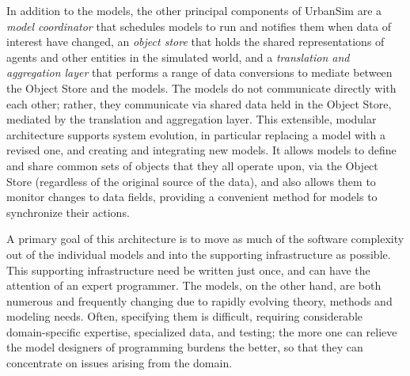 In addition to the models, the other principal components of
UrbanSim are a \emph{model coordinator} that schedules models to
run and notifies them when data of interest have changed, an
\emph{object store} that holds the shared representations of
agents and other entities in the simulated world, and a
\emph{translation and aggregation layer} that performs a range of
data conversions to mediate between the Object Store and the
models.  The models do not communicate directly with each other;
rather, they communicate via shared data held in the Object Store,
mediated by the translation and aggregation layer.  This
extensible, modular architecture supports system evolution, in
particular replacing a model with a revised one, and creating and
integrating new models.  It allows models to define and share
common sets of objects that they all operate upon, via the Object
Store (regardless of the original source of the data), and also
allows them to monitor changes to data fields, providing a
convenient method for models to synchronize their actions.

A primary goal of this architecture is to move as much of the
software complexity out of the individual models and into the
supporting infrastructure as possible.  This supporting
infrastructure need be written just once, and can have the
attention of an expert programmer.  The models, on the other hand,
are both numerous and frequently changing due to rapidly evolving
theory, methods and modeling needs. Often, specifying them is
difficult, requiring considerable domain-specific expertise,
specialized data, and testing; the more one can relieve the model
designers of programming burdens the better, so that they can
concentrate on issues arising from the domain.

